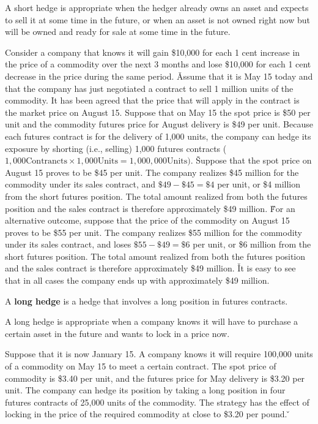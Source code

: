 A short hedge is appropriate when the hedger already owns an asset and expects to sell it at some time in the
future, or when an asset is not owned right now but will be owned and ready for sale at some time in the future.

\be
Consider a company that knows it will gain \$10,000 for each 1 cent increase in the price of a commodity over the next
3 months and lose \$10,000 for each 1 cent decrease in the price during the same period. \v

Assume that it is May 15 today and that the company has just negotiated a contract to sell 1 million units of the
commodity. It has been agreed that the price that will apply in the contract is the market price on August 15.
Suppose that on May 15 the spot price is \$50 per unit and the commodity futures price for August delivery is \$49 per
unit. Because each futures contract is for the delivery of 1,000 units, the company can hedge its exposure by
shorting (i.e., selling) 1,000 futures contracts ($1,000 \text{Contrancts} \times 1,000 \text{Units} = 1,000,000
\text{Units})$. \v

Suppose that the spot price on August 15 proves to be \$45 per unit. The company realizes \$45 million for the commodity
under its sales contract, and $\$49 - \$45 = \$4$ per unit, or \$4 million from the short futures position. The total
amount realized from both the futures position and the sales contract is therefore approximately \$49 million. \v

For an alternative outcome, suppose that the price of the commodity on August 15 proves to be \$55 per unit. The company
realizes \$55 million for the commodity under its sales contract, and loses $\$55 - \$49 = \$6$ per unit, or \$6 million
from the short futures position. The total amount realized from both the futures position and the sales contract is
therefore approximately \$49 million. \v

It is easy to see that in all cases the company ends up with approximately \$49 million.
\ee

A \textbf{long hedge} is a hedge that involves a long position in futures contracts.
\ed

A long hedge is appropriate when a company knows it will have to purchase a certain asset in the future and wants to
lock in a price now.

\be
Suppose that it is now January 15. A company knows it will require 100,000 units of a commodity on May 15 to meet a
certain contract. The spot price of commodity is \$3.40 per unit, and the futures price for May delivery is \$3.20 per
unit. The company can hedge its position by taking a long position in four futures contracts of 25,000 units of the
commodity. The strategy has the effect of locking in the price of the required commodity at close to \$3.20 per pound.
\v

